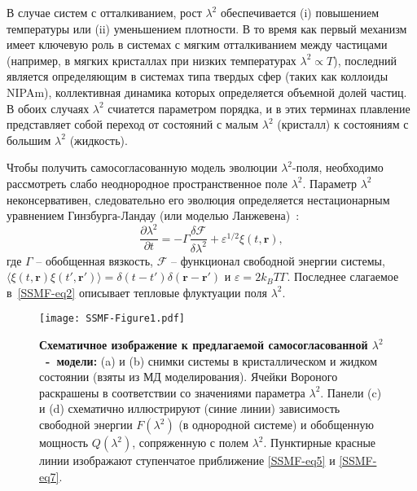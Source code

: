В случае систем с отталкиванием, рост $\lambda^2$ обеспечивается (i) повышением температуры или (ii) уменьшением плотности.
В то время как первый механизм имеет ключевую роль в системах с мягким отталкиванием между частицами (например, в мягких кристаллах при низких температурах $\lambda^2\propto T $), последний является определяющим в системах типа твердых сфер (таких как коллоиды NIPAm), коллективная динамика которых определяется объемной долей частиц.
В обоих случаях $\lambda^2$ счиатется параметром порядка, и в этих терминах плавление представляет собой переход от состояний с малым $\lambda^2$ (кристалл) к состояниям с большим $\lambda^2$ (жидкость).

Чтобы получить самосогласованную модель эволюции $ \lambda^2$-поля,
необходимо рассмотреть слабо неоднородное пространственное поле $\lambda^2$.
Параметр $\lambda ^ 2$ неконсервативен, следовательно его эволюция определяется нестационарным уравнением Гинзбурга-Ландау (или моделью Ланжевена)~\cite{book.desai}:
\begin{equation}
\label{SSMF-eq4}
\frac{\partial \lambda^2}{\partial t} = -\Gamma \frac{\delta \mathcal{F}}{\delta \lambda^2} + \varepsilon^{1/2}\xi(t,\mathbf{r}),
\end{equation}
где $\Gamma$ -- обобщенная вязкость, $ \mathcal{F} $ -- функционал свободной энергии системы, $\langle \xi(t,\mathbf{r})\xi(t',\mathbf{r}')\rangle = \delta(t-t')\delta(\mathbf{r}-\mathbf{r}')$ и $\varepsilon = 2k_BT\Gamma$.
Последнее слагаемое в~\eqref{SSMF-eq2} описывает тепловые флуктуации поля $\lambda^2$.

\begin{figure}[!t]
\centering
  \texttt{[image: SSMF-Figure1.pdf]}
  \caption{\textbf{Схематичное изображение к предлагаемой самосогласованной $\lambda^2$~-~модели:}
  (a) и (b) снимки системы в кристаллическом и жидком состоянии (взяты из МД моделирования).
  Ячейки Вороного раскрашены в соответствии со значениями параметра $ \lambda^2$.
  Панели (c) и (d) схематично иллюстрируют (синие линии) зависимость свободной энергии $ F (\lambda ^ 2) $ (в однородной системе) и обобщенную мощность $ Q (\lambda ^ 2) $, сопряженную с полем $\lambda^2$.
  Пунктирные красные линии изображают ступенчатое приближение \eqref{SSMF-eq5} и \eqref{SSMF-eq7}.
  }
\label{SSMF-Figure1}
\end{figure}


